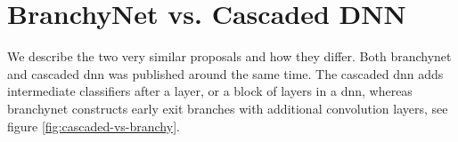 %

\section{BranchyNet vs. Cascaded DNN} \label{sec:ee-branchy-vs-cascaded}

We describe the two very similar proposals and how they differ. Both \gls{branchynet} \cite{teerapittayanon_branchynet:_2016} and cascaded \gls{dnn} \cite{leroux_resource-constrained_2015} was published around the same time. The cascaded \gls{dnn} adds intermediate classifiers after a layer, or a block of layers in a \gls{dnn}, whereas \gls{branchynet} constructs early exit branches with additional convolution layers, see figure \ref{fig:cascaded-vs-branchy}.


